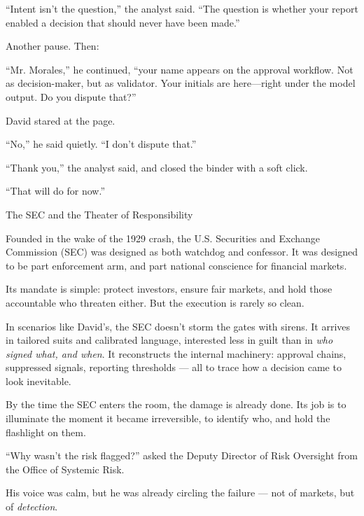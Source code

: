 ``Intent isn't the question,'' the analyst said. ``The question is whether your report enabled a decision that 
should never have been made.''

Another pause. Then:

``Mr. Morales,'' he continued, ``your name appears on the approval workflow. Not as decision-maker, but as 
validator. Your initials are here—right under the model output. Do you dispute that?''

David stared at the page.

``No,'' he said quietly. ``I don’t dispute that.''

``Thank you,'' the analyst said, and closed the binder with a soft click.

``That will do for now.''

\medskip

\begin{HistoricalSidebar}{The SEC and the Theater of Responsibility}

  Founded in the wake of the 1929 crash, the U.S. Securities and Exchange Commission (SEC) was designed as both 
  watchdog and confessor. It was designed to be part enforcement arm, and part national conscience for financial markets.

  \medskip
  
  Its mandate is simple: protect investors, ensure fair markets, and hold those accountable who threaten either. 
  But the execution is rarely so clean.

  \medskip
  
  In scenarios like David’s, the SEC doesn't storm the gates with sirens. It arrives in tailored suits and 
  calibrated language, interested less in guilt than in \textit{who signed what, and when}. It reconstructs the internal 
  machinery: approval chains, suppressed signals, reporting thresholds — all to trace how a decision came to look inevitable.

  \medskip
  
  By the time the SEC enters the room, the damage is already done. Its job is to illuminate the moment it became 
  irreversible, to identify who, and hold the flashlight on them.
  
\end{HistoricalSidebar}

\medskip

``Why wasn’t the risk flagged?'' asked the Deputy Director of Risk Oversight from the Office of Systemic Risk.

His voice was calm, but he was already circling the failure — not of markets, but of \textit{detection}.

